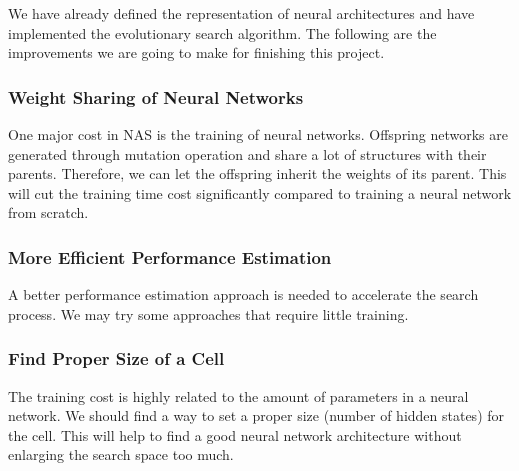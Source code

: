 \documentclass[conference]{IEEEtran}
\begin{document}
 We have already defined the representation of neural architectures and have implemented the evolutionary search algorithm. The following are the improvements we are going to make for finishing this project.
 
  
  \subsubsection{Weight Sharing of Neural Networks}    
  One major cost in NAS is the training of neural networks. Offspring networks are generated through mutation operation and share a lot of structures with their parents. Therefore, we can let the offspring inherit the weights of its parent. This will cut the training time cost significantly compared to training a neural network from scratch.
  
  \subsubsection{More Efficient Performance Estimation}
  A better performance estimation approach is needed to accelerate the search process. We may try some approaches that require little training.
  
  \subsubsection{Find Proper Size of a Cell}
  The training cost is highly related to the amount of parameters in a neural network. We should find a way to set a proper size (number of hidden states) for the cell. This will help to find a good neural network architecture without enlarging the search space too much.
   



\end{document}
